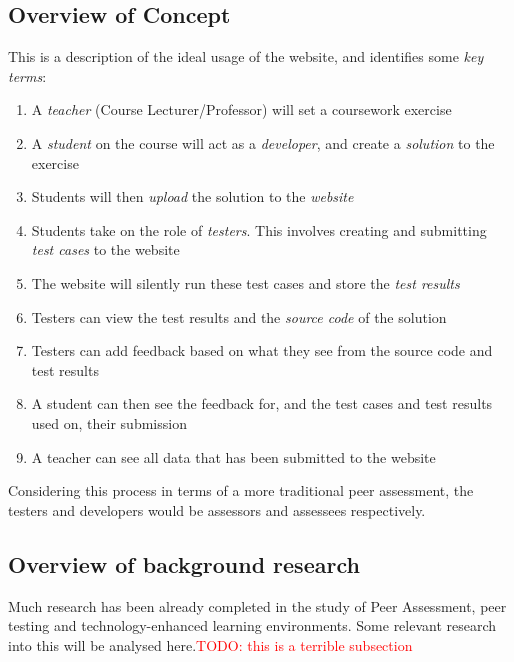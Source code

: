 \documentclass[a4paper,11pt]{report}
\newcommand{\todo}[1]{\textcolor{red}{TODO: #1}}
\begin{document}
\subsection{Overview of Concept}
This is a description of the ideal usage of the website, and identifies some \textit{key terms}:
\begin{enumerate}
 \item A \textit{teacher} (Course Lecturer/Professor) will set a coursework exercise
 \item A \textit{student} on the course will act as a \textit{developer}, and create a \textit{solution} to the exercise
 \item Students will then \textit{upload} the solution to the \textit{website}
 \item Students take on the role of \textit{testers}. This involves creating and submitting \textit{test cases} to the website
 \item The website will silently run these test cases and store the \textit{test results}
 \item Testers can view the test results and the \textit{source code} of the solution
 \item Testers can add feedback based on what they see from the source code and test results
 \item A student can then see the feedback for, and the test cases and test results used on, their submission
 \item A teacher can see all data that has been submitted to the website 
\end{enumerate}
Considering this process in terms of a more traditional peer assessment, the testers and developers would be assessors and assessees respectively.

\subsection{Overview of background research}
Much research has been already completed in the study of Peer Assessment, peer testing and technology-enhanced learning environments. Some relevant research into this will be analysed here.\todo{this is a terrible subsection}

\end{document}
